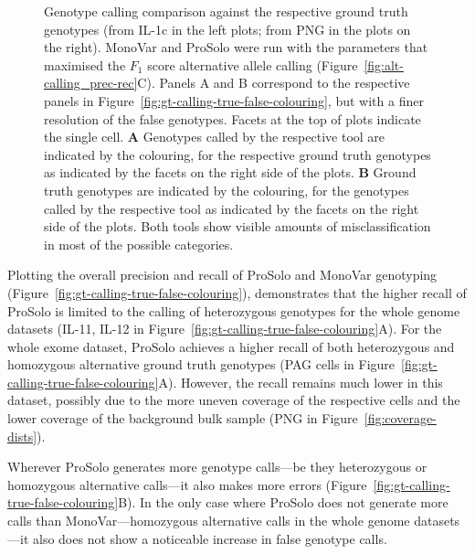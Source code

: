\documentclass[authoryear,preprint,11pt]{scrartcl}
\begin{document}
\begin{figure}[!tpb]
\begin{minipage}{.53\linewidth}
 \end{minipage}
 \caption{
  Genotype calling comparison against the respective ground truth genotypes (from IL-1c in the left plots; from PNG in the plots on the right).
  MonoVar and ProSolo were run with the parameters that maximised the $F_1$ score alternative allele calling (Figure~\ref{fig:alt-calling_prec-rec}C).
  Panels A and B correspond to the respective panels in Figure~\ref{fig:gt-calling-true-false-colouring}, but with a finer resolution of the false genotypes.
  Facets at the top of plots indicate the single cell.
  \textbf{A} Genotypes called by the respective tool are indicated by the colouring, for the respective ground truth genotypes  as indicated by the facets on the right side of the plots.
  \textbf{B} Ground truth genotypes are indicated by the colouring, for the genotypes called by the respective tool as indicated by the facets on the right side of the plots.
  Both tools show visible amounts of misclassification in most of the possible categories.
  }
\label{fig:gt-calling-gt-colouring}
\end{figure}

Plotting the overall precision and recall of ProSolo and MonoVar genotyping (Figure~\ref{fig:gt-calling-true-false-colouring}), demonstrates that the higher recall of ProSolo is limited to the calling of heterozygous genotypes for the whole genome datasets (IL-11, IL-12 in Figure~\ref{fig:gt-calling-true-false-colouring}A).
For the whole exome dataset, ProSolo achieves a higher recall of both heterozygous and homozygous alternative ground truth genotypes (PAG cells in Figure~\ref{fig:gt-calling-true-false-colouring}A).
However, the recall remains much lower in this dataset, possibly due to the more uneven coverage of the respective cells and the lower coverage of the background bulk sample (PNG in Figure~\ref{fig:coverage-dists}).

Wherever ProSolo generates more genotype calls---be they heterozygous or homozygous alternative calls---it also makes more errors (Figure~\ref{fig:gt-calling-true-false-colouring}B).
In the only case where ProSolo does not generate more calls than MonoVar---homozygous alternative calls in the whole genome datasets---it also does not show a noticeable increase in false genotype calls.
\end{document}
